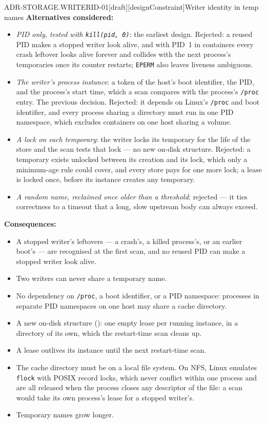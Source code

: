 \begin{requirement}{ADR-STORAGE.WRITERID-01}[draft][designConstraint]{Writer identity in temp names}
  \textbf{Alternatives considered:}
  \begin{itemize}
    \item \emph{PID only, tested with \texttt{kill(pid, 0)}}: the earliest
      design. Rejected: a reused PID makes a stopped writer look alive, and
      with PID~1 in containers every crash leftover looks alive forever and
      collides with the next process's temporaries once its counter restarts;
      \texttt{EPERM} also leaves liveness ambiguous.
    \item \emph{The writer's process instance}: a token of the host's boot
      identifier, the PID, and the process's start time, which a scan
      compares with the process's \texttt{/proc} entry. The previous
      decision. Rejected: it depends on Linux's \texttt{/proc} and boot
      identifier, and every process sharing a directory must run in one PID
      namespace, which excludes containers on one host sharing a volume.
    \item \emph{A lock on each temporary}: the writer locks its temporary for
      the life of the store and the scan tests that lock --- no new on-disk
      structure. Rejected: a temporary exists unlocked between its creation
      and its lock, which only a minimum-age rule could cover, and every
      store pays for one more lock; a lease is locked once, before its
      instance creates any temporary.
    \item \emph{A random name, reclaimed once older than a threshold}:
      rejected --- it ties correctness to a timeout that a long, slow upstream
      body can always exceed.
  \end{itemize}

  \textbf{Consequences:}
  \begin{itemize}
    \item[+] A stopped writer's leftovers --- a crash's, a killed process's, or
      an earlier boot's --- are recognised at the first scan, and no reused
      PID can make a stopped writer look alive.
    \item[+] Two writers can never share a temporary name.
    \item[+] No dependency on \texttt{/proc}, a boot identifier, or a PID
      namespace: processes in separate PID namespaces on one host may share a
      cache directory.
    \item[--] A new on-disk structure (): one empty
      lease per running instance, in a directory of its own, which the
      restart-time scan cleans up.
    \item[--] A lease outlives its instance until the next restart-time scan.
    \item[--] The cache directory must be on a local file system. On NFS,
      Linux emulates \texttt{flock} with POSIX record locks, which never
      conflict within one process and are all released when the process
      closes any descriptor of the file: a scan would take its own
      process's lease for a stopped writer's.
    \item[--] Temporary names grow longer.
  \end{itemize}


\end{requirement}
